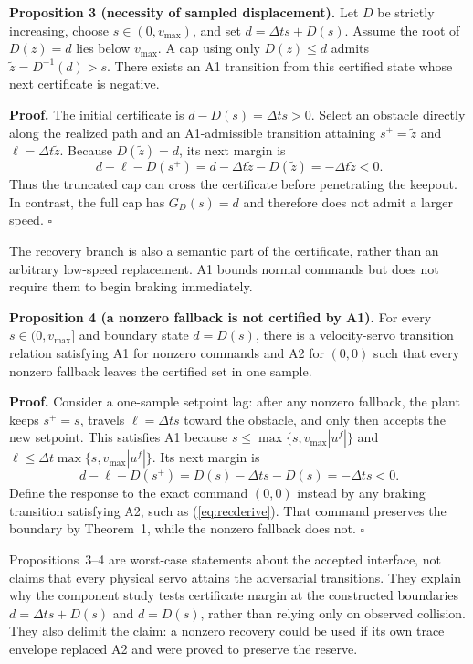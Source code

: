 \documentclass[letterpaper]{article}
\begin{document}
\textbf{Proposition 3 (necessity of sampled displacement).}
Let $D$ be strictly increasing, choose $s\in(0,v_{\max})$, and set
$d=\Delta t s+D(s)$.  Assume the root of $D(z)=d$ lies below $v_{\max}$.
A cap using only $D(z)\le d$ admits $\tilde z=D^{-1}(d)>s$.  There exists an
A1 transition from this certified state whose next certificate is negative.

\textbf{Proof.}
The initial certificate is
$d-D(s)=\Delta t s>0$.  Select an obstacle directly along the realized path
and an A1-admissible transition attaining
$s^+=\tilde z$ and $\ell=\Delta t\tilde z$.  Because
$D(\tilde z)=d$, its next margin is
\begin{equation}
 d-\ell-D(s^+)
 =d-\Delta t\tilde z-D(\tilde z)
 =-\Delta t\tilde z<0.                                 \label{eq:nosamplecounter}
\end{equation}
Thus the truncated cap can cross the certificate before penetrating the
keepout.  In contrast, the full cap has $G_D(s)=d$ and therefore does not
admit a larger speed. $\square$

The recovery branch is also a semantic part of the certificate, rather than
an arbitrary low-speed replacement.  A1 bounds normal commands but does not
require them to begin braking immediately.

\textbf{Proposition 4 (a nonzero fallback is not certified by A1).}
For every $s\in(0,v_{\max}]$ and boundary state $d=D(s)$, there is a
velocity-servo transition relation satisfying A1 for nonzero commands and A2
for $(0,0)$ such that every nonzero fallback leaves the certified set in one
sample.

\textbf{Proof.}
Consider a one-sample setpoint lag: after any nonzero fallback, the plant keeps
$s^+=s$, travels $\ell=\Delta t s$ toward the obstacle, and only then accepts
the new setpoint.  This satisfies A1 because
$s\le\max\{s,v_{\max}|u^f|\}$ and
$\ell\le\Delta t\max\{s,v_{\max}|u^f|\}$.  Its next margin is
\begin{equation}
 d-\ell-D(s^+)=D(s)-\Delta t s-D(s)=-\Delta t s<0.
                                                               \label{eq:noreccounter}
\end{equation}
Define the response to the exact command $(0,0)$ instead by any braking
transition satisfying A2, such as (\ref{eq:recderive}).  That command preserves
the boundary by Theorem~1, while the nonzero fallback does not. $\square$

Propositions~3--4 are worst-case statements about the accepted interface, not
claims that every physical servo attains the adversarial transitions.  They
explain why the component study tests certificate margin at the constructed
boundaries $d=\Delta t s+D(s)$ and $d=D(s)$, rather than relying only on
observed collision.  They also delimit the claim: a nonzero recovery could be
used if its own trace envelope replaced A2 and were proved to preserve the
reserve.
\end{document}
